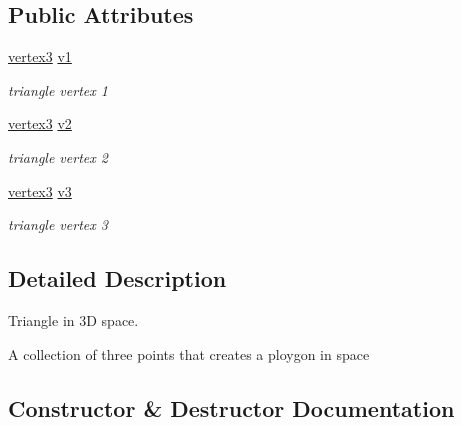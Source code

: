 \subsection*{Public Attributes}
\begin{DoxyCompactItemize}
\item 
\mbox{\label{structsisl_1_1triangle_ad86734de300b5c09c56d5aba5ecf33f7}} 
\hyperlink{structsisl_1_1vertex3}{vertex3} \hyperlink{structsisl_1_1triangle_ad86734de300b5c09c56d5aba5ecf33f7}{v1}
\begin{DoxyCompactList}\small\item\em triangle vertex 1 \end{DoxyCompactList}\item 
\mbox{\label{structsisl_1_1triangle_a6f6ca60258efc6eed6f8fe52d0945c7e}} 
\hyperlink{structsisl_1_1vertex3}{vertex3} \hyperlink{structsisl_1_1triangle_a6f6ca60258efc6eed6f8fe52d0945c7e}{v2}
\begin{DoxyCompactList}\small\item\em triangle vertex 2 \end{DoxyCompactList}\item 
\mbox{\label{structsisl_1_1triangle_a5e1cdf5601cccbaaa1ff340003f9c54d}} 
\hyperlink{structsisl_1_1vertex3}{vertex3} \hyperlink{structsisl_1_1triangle_a5e1cdf5601cccbaaa1ff340003f9c54d}{v3}
\begin{DoxyCompactList}\small\item\em triangle vertex 3 \end{DoxyCompactList}\end{DoxyCompactItemize}


\subsection{Detailed Description}
Triangle in 3D space. 

A collection of three points that creates a ploygon in space 

\subsection{Constructor \& Destructor Documentation}
\mbox{\label{structsisl_1_1triangle_a0e0dcd17f1c5e16ecb79daceb604c19a}} 
